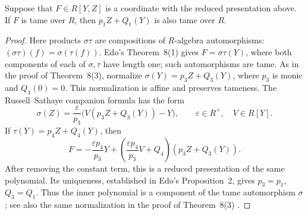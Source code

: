 \begin{lemma}\label{lem:inner-wild}
Suppose that $F\in R[Y,Z]$ is a coordinate with the reduced presentation
above. If $F$ is tame over $R$, then $p_1Z+Q_1(Y)$ is also tame over $R$.
\end{lemma}
\begin{proof}
Here products $\sigma\tau$ are compositions of $R$-algebra
automorphisms: $(\sigma\tau)(f)=\sigma(\tau(f))$.
Edo's Theorem~8(1) gives $F=\sigma\tau(Y)$, where both components of each
of $\sigma,\tau$ have length one; such automorphisms are tame.
As in the proof of Theorem~8(3), normalize
$\sigma(Y)=p_3Z+Q_3(Y)$, where $p_3$ is monic and $Q_3(0)=0$.
This normalization is affine and preserves tameness.
The Russell--Sathaye companion formula has the form
\[
 \sigma(Z)=\frac{\varepsilon}{p_3}
 \bigl(V(p_3Z+Q_3(Y))-Y\bigr),\qquad
 \varepsilon\in R^\times,\quad V\in R[Y].
\]
If $\tau(Y)=p_4Z+Q_4(Y)$, then
\[
 F=-\frac{\varepsilon p_4}{p_3}Y+
 \left(\frac{\varepsilon p_4}{p_3}V+Q_4\right)
 (p_3Z+Q_3(Y)).
\]
After removing the constant term, this is a reduced presentation of the
same polynomial. Its uniqueness, established in Edo's Proposition~2,
gives $p_3=p_1$, $Q_3=Q_1$. Thus the inner polynomial is a component of
the tame automorphism $\sigma$; see also the same normalization in the
proof of Theorem~8(3) \cite{Edo2013}.
\end{proof}

